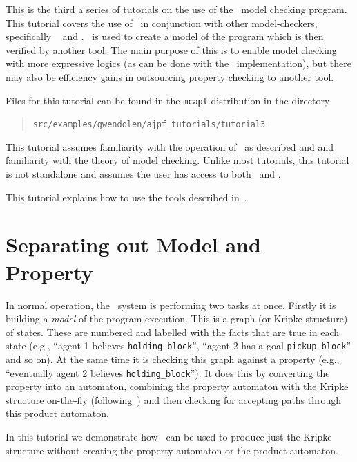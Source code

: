 
This is the third a series of tutorials on the use of the \ajpf\ model checking program.  This tutorial covers the use of \ajpf\ in conjunction with other model-checkers, specifically \spin\  and \prism{}.  \ajpf\ is used to create a model of the program which is then verified by another tool.  The main purpose of this is to enable model checking with more expressive logics (as can be done with the \prism\ implementation), but there may also be efficiency gains in outsourcing property checking to another tool.

Files for this tutorial can be found in the \texttt{mcapl} distribution in the directory 
\begin{quote}
\texttt{src/examples/gwendolen/ajpf\_tutorials/tutorial3}.
\end{quote}

This tutorial assumes familiarity with the operation of \ajpf\ as described  and  and familiarity with the theory of model checking.  Unlike most tutorials, this tutorial is not standalone and assumes the user has access to both \spin\ and \prism{}.

This tutorial explains how to use the tools described in~\cite{dennis15:_two}.

\section{Separating out Model and Property}

In normal operation, the \ajpf\ system is performing two tasks at once.  Firstly it is building a \emph{model} of the program execution.  This is a graph (or Kripke structure) of states.  These are numbered and labelled with the facts that are true in each state (e.g., ``agent 1 believes \texttt{holding\_block}'', ``agent 2 has a goal \texttt{pickup\_block}'' and so on).  At the same time it is checking this graph against a property (e.g., ``eventually agent 2 believes \texttt{holding\_block}'').  It does this by converting the property into an automaton, combining the property automaton with the Kripke structure on-the-fly (following~\cite{Gerth:1995:SOA:645837.670574,Courcoubetis92mea}) and then checking for accepting paths through this product automaton.

In this tutorial we demonstrate how \ajpf\ can be used to produce just the Kripke structure without creating the property automaton or the product automaton.

